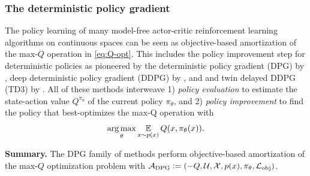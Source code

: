 \documentclass[twoside,11pt]{article}
\begin{document}
\subsubsection{The deterministic policy gradient}
The policy learning of many model-free actor-critic
reinforcement learning algorithms on continuous spaces
can be seen as objective-based amortization of the
max-$Q$ operation in \cref{eq:Q-opt}.
This includes the policy improvement step for
deterministic policies as pioneered by the
deterministic policy gradient (DPG) by \citet{silver2014dpg},
deep deterministic policy gradient (DDPG) by \citet{lillicrap2015continuous},
and and twin delayed DDPG (TD3) by \citet{fujimoto2018td3}.
All of these methods interweave
1) \emph{policy evaluation} to estimate the
state-action value $Q^{\pi_\theta}$ of the current policy
$\pi_\theta$, and
2) \emph{policy improvement} to find the policy
that best-optimizes the max-Q operation with
\begin{equation}
  \operatorname*{arg\,max}_\theta \operatorname*{\mathbb{E}}_{x\sim p(x)} Q(x, \pi_\theta(x)).
  \label{eq:dpg-loss}
\end{equation}

\textbf{Summary.}
The DPG family of methods perform objective-based
amortization of the max-$Q$ optimization problem with
${\mathcal{A}}_{\rm DPG}\vcentcolon= (-Q, {\mathcal{U}}, {\mathcal{X}}, p(x), \pi_\theta, {\mathcal{L}}_{\rm obj})$.
\end{document}
